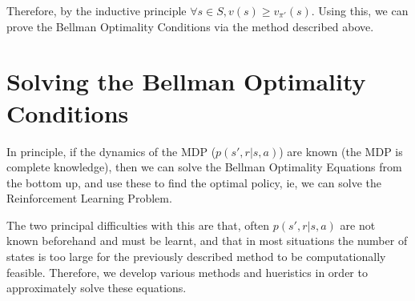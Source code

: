 \documentclass[12pt]{report}
\begin{document}
Therefore, by the inductive principle $\forall s \in S, v(s) \geq v_{\pi'}(s)$. Using this, we can prove the Bellman Optimality Conditions via the method described above.
\section{Solving the Bellman Optimality Conditions}
In principle, if the dynamics of the MDP ($p(s', r | s, a)$) are known (the MDP is complete knowledge), then we can solve the Bellman Optimality Equations from the bottom up, and use these to find the optimal policy, ie, we can solve the Reinforcement Learning Problem.

The two principal difficulties with this are that, often $p(s', r | s, a)$ are not known beforehand and must be learnt, and that in most situations the number of states is too large for the previously described method to be computationally feasible. Therefore, we develop various methods and 
hueristics in order to approximately solve these equations.
\end{document}
